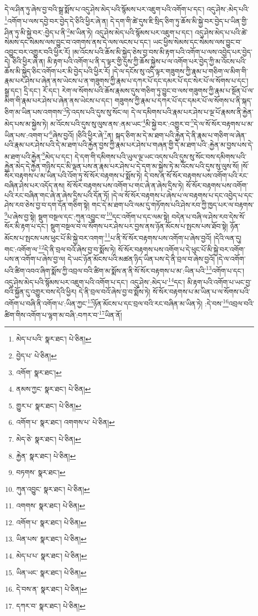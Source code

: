 དེ་ལ་ཤིན་ཏུ་ཞེས་བྱ་བའི་སྒྲ་སྨོས་པ་འདུ་ཤེས་མེད་པའི་སྙོམས་པར་འཇུག་པའི་འགོག་པ་དང་། འདུ་ཤེས་:མེད་པའི་\footnote{མེད་པ་པའི་  སྣར་ཐང་།  པེ་ཅིན། }འགོག་པ་ལས་དབྱེ་བར་བྱེད་དེ་ཅིའི་ཕྱིར་ཞེ་ན། དེ་དག་གི་ཚེ་དུས་ཇི་སྲིད་ཅིག་ཏུ་ཆོས་མི་སྐྱེ་བར་བྱེད་པ་ཡིན་གྱི་ཤིན་ཏུ་མི་སྐྱེ་བར་:བྱེད་པ་ནི་\footnote{བྱེད་པ་  པེ་ཅིན། }མ་ཡིན་ཏེ། འདུ་ཤེས་མེད་པའི་སྙོམས་པར་འཇུག་པ་དང་། འདུ་ཤེས་མེད་པ་པའི་ཚེ་སེམས་དང་སེམས་ལས་བྱུང་བ་འགགས་ནས་དེ་ལས་ལངས་པ་དང་། ཡང་ཕྱིས་སེམས་དང་སེམས་ལས་བྱུང་བ་འབྱུང་བར་འགྱུར་བའི་ཕྱིར་རོ། །མ་འོངས་པའི་ཆོས་མི་སྐྱེད་ཅེས་བྱ་བས་མི་རྟག་པའི་འགོག་པ་ལས་འབྱེད་པར་བྱེད་དེ། ཅིའི་ཕྱིར་ཞེ་ན། མི་རྟག་པའི་འགོག་པ་ནི་ད་ལྟར་གྱི་དུས་ཀྱི་ཆོས་སྐྱེས་པ་ལ་འགོག་པར་བྱེད་ཀྱི་མ་འོངས་པའི་ཆོས་མི་སྐྱེད་ཅིང་འགོག་པར་མི་བྱེད་པའི་ཕྱིར་རོ། །དེ་ལ་དངོས་སུ་འདི་ལྟར་གཟུགས་ཀྱི་རྣམ་པ་གཅིག་ལ་མིག་གི་རྣམ་པར་ཤེས་པ་ཞེན་ནས་ཡེངས་པ་ན་གཟུགས་ཀྱི་རྣམ་པ་དཀར་པོ་དང་དམར་པོ་དང་སེར་པོ་ལ་སོགས་པ་དང་། སྒྲ་དང་། དྲི་དང་། རོ་དང་། རེག་ལ་སོགས་པའི་ཆོས་རྣམས་དུས་གཅིག་ཏུ་བྱུང་བ་ལས་གཟུགས་ཀྱི་རྣམ་པ་སྔོན་པོ་ལ་མིག་གི་རྣམ་པར་ཤེས་པ་ཞེན་ནས་ཡེངས་པ་དང་། གཟུགས་ཀྱི་རྣམ་པ་དཀར་པོ་དང་དམར་པོ་ལ་སོགས་པ་ནི་སྐད་ཅིག་མ་ཡིན་པས་འགགས་\footnote{འགོག་  སྣར་ཐང་། }ཏེ་འདས་པའི་དུས་སུ་སོང་ལ། དེ་ལ་དམིགས་པའི་རྣམ་པར་ཤེས་པ་ལྔ་པོ་རྣམས་ནི་རྐྱེན་མེད་པས་མ་སྐྱེས་ཏེ། མ་འོངས་པའི་དུས་སུ་ལུས་ནས་:ནམ་ཡང་\footnote{ནམས་ཀྱང་  སྣར་ཐང་།  པེ་ཅིན། }མི་སྐྱེ་བར་:འགྱུར་བ་\footnote{གྱུར་པ་  སྣར་ཐང་།  པེ་ཅིན། }དེ་ལ་སོ་སོར་བརྟགས་པ་མ་ཡིན་པས་:འགག་པ་\footnote{འགོག་པ་  སྣར་ཐང་། འགགས་པ་  པེ་ཅིན། }ཞེས་བྱའོ། །ཅིའི་ཕྱིར་ཞེ་\footnote{མེད་ཅེ་  སྣར་ཐང་།  པེ་ཅིན། }ན། སྐད་ཅིག་མ་དེ་མ་ཐག་པའི་རྐྱེན་དེ་ནི་རྣམ་པ་གཅིག་ལ་ཞེན་པའི་རྣམ་པར་ཤེས་པའི་དེ་མ་ཐག་པའི་རྐྱེན་བྱས་ཀྱི་རྣམ་པར་ཤེས་པ་གཞན་གྱི་དེ་མ་ཐག་པའི་:རྐྱེན་མ་བྱས་པས་དེ་མ་ཐག་པའི་རྐྱེན་\footnote{རྐྱེན་  སྣར་ཐང་།  པེ་ཅིན། }མེད་པ་དང་། དེ་དག་གི་དམིགས་པའི་ཡུལ་ལྔ་ཡང་འདས་པའི་དུས་སུ་སོང་བས་དམིགས་པའི་རྐྱེན་མེད་དེ་རྐྱེན་གཉིས་དང་མི་ལྡན་པས་ན་རྣམ་པར་ཤེས་པ་དེ་དག་མ་སྐྱེས་ཏེ་མ་འོངས་པའི་དུས་སུ་ལུས་སོ། །སོ་སོར་བརྟགས་པ་མ་ཡིན་པའི་འོག་ཏུ་སོ་སོར་བརྟགས་པ་སྨོས་ཏེ། དེ་བས་ན་སོ་སོར་བརྟགས་པས་འགོག་པའི་རང་བཞིན་ཤེས་པར་འདོད་ནས། སོ་སོར་བརྟགས་པས་འགོག་པ་གང་ཞེ་ན་ཞེས་དྲིས་ཏེ། སོ་སོར་བརྟགས་པས་འགོག་པའི་རང་བཞིན་གང་ཞེ་ན་ཞེས་དྲིས་པའི་དོན་ཏོ། །དེ་ལ་སོ་སོར་བརྟགས་པ་ཞེས་པ་ལ་བརྟགས་པ་དང་འབྱེད་པ་དང་ཤེས་རབ་ཅེས་བྱ་བ་དག་དོན་གཅིག་སྟེ། གང་དེ་མ་ཐག་པའི་ལམ་དུ་གཏོགས་པའི་ཤེས་རབ་ཀྱི་ཁྱད་པར་ལ་བརྟགས་\footnote{བཏགས་  སྣར་ཐང་། }པ་ཞེས་བྱ་སྟེ། སྡུག་བསྔལ་དང་:ཀུན་འབྱུང་བ་\footnote{ཀུན་འབྱུང་  སྣར་ཐང་།  པེ་ཅིན། }དང་འགོག་པ་དང་ལམ་སྟེ། བདེན་པ་བཞི་ལ་ཤེས་རབ་དེས་སོ་སོར་མི་རྟག་པ་དང་། སྡུག་བསྔལ་བ་ལ་སོགས་པར་ཤེས་པར་བྱས་ནས་ཉོན་མོངས་པ་སྤངས་པས་ཐོབ་སྟེ། ཉོན་མོངས་པ་སྤངས་པས་ཕུང་པོ་མི་སྐྱེ་བར་འགག་\footnote{འགགས་  སྣར་ཐང་།  པེ་ཅིན། }པ་ནི་སོ་སོར་བརྟགས་པས་འགོག་པ་ཞེས་བྱའོ། །དེའི་ལན་དུ། གང་:འགོག་ལ་\footnote{འགོག་པ་  སྣར་ཐང་།  པེ་ཅིན། }དེ་ནི་བྲལ་བའོ་ཞེས་བྱ་བ་སྨོས་ཏེ། སོ་སོར་བརྟགས་པས་འགོག་པ་དེ་ཕུང་པོ་མི་སྐྱེ་བར་འགོག་པས་ན་འགོག་པ་ཞེས་བྱ་ལ། དེ་ཡང་ཉོན་མོངས་པའི་མཚན་ཉིད་ཡིན་པས་དེ་ནི་བྲལ་བ་ཞེས་བྱའོ། །དེ་ལ་འགོག་པའི་ཚིག་འབའ་ཞིག་སྨོས་ཀྱི་འབྲལ་བའི་ཚིག་མ་སྨོས་ན་ནི་སོ་སོར་བརྟགས་པ་མ་:ཡིན་པའི་\footnote{ཡིན་པས་  སྣར་ཐང་།  པེ་ཅིན། }འགོག་པ་དང་། འདུ་ཤེས་མེད་པའི་སྙོམས་པར་འཇུག་པའི་འགོག་པ་དང་། འདུ་ཤེས་:མེད་པ་\footnote{མེད་པ་པ་  སྣར་ཐང་།  པེ་ཅིན། }དང་། མི་རྟག་པའི་འགོག་པ་ཡང་བྱ་བའི་སྐྱོན་དུ་འགྱུར་བས་དེའི་ཕྱིར། དེ་ནི་བྲལ་བའོ་ཞེས་བྱ་བ་སྨོས་ཏེ། སོ་སོར་བརྟགས་པ་མ་ཡིན་པ་ལ་སོགས་པའི་འགོག་པ་བཞི་ནི་འགོག་པ་:ཡིན་ཀྱང་\footnote{ཡིན་ཡང་  སྣར་ཐང་།  པེ་ཅིན། }ཉོན་མོངས་པ་དང་བྲལ་བའི་རང་བཞིན་མ་ཡིན་ཏེ། :དེ་བས་\footnote{དེ་བས་ན་  སྣར་ཐང་།  པེ་ཅིན། }འབྲལ་བའི་ཚིག་གིས་འགོག་པ་ལྷག་མ་བཞི་:བཀར་བ་\footnote{དཀར་བ་  སྣར་ཐང་།  པེ་ཅིན། }ཡིན་ནོ། 